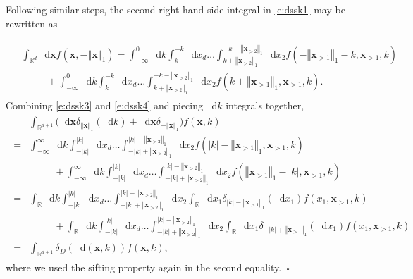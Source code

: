 \documentclass[11pt,A4,twoside]{article}
\numberwithin{equation}{section}
\renewcommand*\d{\mathop{}\!\mathrm{d}}
\newcommand{\norml}[1]{\left\Vert#1 \right\Vert_{1}}
\newcommand{\x}{\mathbf{x}}
\newcommand{\R}{\mathbbm{R}}
\newcommand{\intR}{\int_{\R}}
\def\qqq{\;\;\;\;\;\;\;\;\;}
\def\bel{\begin{eqnarray*}\begin{aligned}}
\def\eel{\end{aligned}\end{eqnarray*}}
\newcommand{\beqa}{\begin{eqnarray}}
\newcommand{\eeqa}{\end{eqnarray}}
\def\bal{\begin{aligned}}
\def\eal{\end{aligned}}
\def\bll#1{
\beqa\label{#1}\bal
}\def\lel{\eal\eeqa}
\newcommand{\beql}[1]{\bll{#1}}
\newcommand{\eeql}{\lel}
\theoremstyle{definition}
\theoremstyle{remark}
\def\R{\mathbb{R}}
\def\finproof {$\Box$ \vskip 5 pt }\def\finproof{\rule{4pt}{6pt}}\def\finproof{\ensuremath{\square}}
\begin{document}
Following similar steps, the second right-hand side integral in \eqref{e:dssk1} may be rewritten as
\beql{e:dssk4}
&\int_{\R^{d}} \d \x f(\x,-\norml{\x}) = \int^0_{-\infty} \d k \int_{k}^{-k}\d x_d\dots\int_{k+\norml{\x_{>2}}}^{-k-\norml{\x_{>2}}}\d x_{2}f(-\norml{\x_{>1}}-k,\x_{>1},k) \\
&\qqq +  \int^0_{-\infty} \d k \int_{k}^{-k}\d x_d\dots\int_{k+\norml{\x_{>2}}}^{-k-\norml{\x_{>2}}}\d x_{2} f(k+\norml{\x_{>1}},\x_{>1},k).
\eeql
Combining \eqref{e:dssk3} and \eqref{e:dssk4} and piecing $\d k$ integrals together,
\bel%
&\int_{\R^{d+1}} \big(\d \x \delta_{\norml{\x}}(\d k) + \d \x \delta_{-\norml{\x}}\big)f(\x,k) \\
= & \int_{-\infty}^\infty \d k \int_{-|k|}^{|k|}\d x_d\dots\int_{-|k|+\norml{\x_{>2}}}^{|k|-\norml{\x_{>2}}}\d x_{2}f(|k|-\norml{\x_{>1}},\x_{>1},k) \\
&\qqq+\int_{-\infty}^\infty \d k \int_{-|k|}^{|k|}\d x_d\dots\int_{-|k|+\norml{\x_{>2}}}^{|k|-\norml{\x_{>2}}}\d x_{2}f(\norml{\x_{>1}}-|k|,\x_{>1},k) \\
=& \intR \d k \int_{-|k|}^{|k|}\d x_d\dots\int_{-|k|+\norml{\x_{>2}}}^{|k|-\norml{\x_{>2}}}\d x_{2} \intR \d x_1 \delta_{|k|-\norml{\x_{>1}}}(\d x_1) f(x_1,\x_{>1},k)\\
&\qqq+\int_\R \d k \int_{-|k|}^{|k|}\d x_d\dots\int_{-|k|+\norml{\x_{>2}}}^{|k|-\norml{\x_{>2}}}\d x_{2} \intR \d x_1  \delta_{-|k|+\norml{\x_{>1}}}(\d x_1) f(x_1,\x_{>1},k)\\
=& \int_{\R^{d+1}} \delta_D(\d(\x,k))f(\x,k),
\eel
where we used the sifting property again in the second equality.\ \finproof%
 
\end{document}
